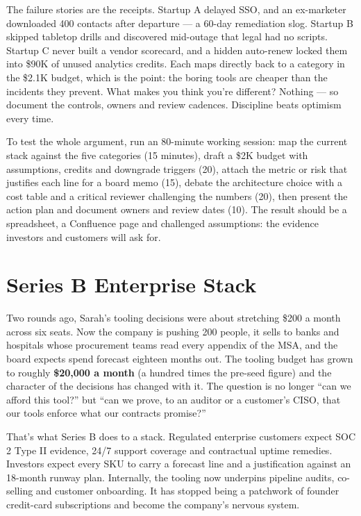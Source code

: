 The failure stories are the receipts. Startup A delayed SSO, and an ex-marketer downloaded 400 contacts after departure — a 60-day remediation slog. Startup B skipped tabletop drills and discovered mid-outage that legal had no scripts. Startup C never built a vendor scorecard, and a hidden auto-renew locked them into \$90K of unused analytics credits. Each maps directly back to a category in the \$2.1K budget, which is the point: the boring tools are cheaper than the incidents they prevent. What makes you think you're different? Nothing — so document the controls, owners and review cadences. Discipline beats optimism every time.


To test the whole argument, run an 80-minute working session: map the current stack against the five categories (15 minutes), draft a \$2K budget with assumptions, credits and downgrade triggers (20), attach the metric or risk that justifies each line for a board memo (15), debate the architecture choice with a cost table and a critical reviewer challenging the numbers (20), then present the action plan and document owners and review dates (10). The result should be a spreadsheet, a Confluence page and challenged assumptions: the evidence investors and customers will ask for.

\section{Series B Enterprise Stack}
Two rounds ago, Sarah's tooling decisions were about stretching \$200 a month across six seats. Now the company is pushing 200 people, it sells to banks and hospitals whose procurement teams read every appendix of the MSA, and the board expects spend forecast eighteen months out. The tooling budget has grown to roughly \textbf{\$20,000 a month} (a hundred times the pre-seed figure) and the character of the decisions has changed with it. The question is no longer ``can we afford this tool?'' but ``can we prove, to an auditor or a customer's CISO, that our tools enforce what our contracts promise?''


That's what Series B does to a stack. Regulated enterprise customers expect SOC 2 Type II evidence, 24/7 support coverage and contractual uptime remedies. Investors expect every SKU to carry a forecast line and a justification against an 18-month runway plan. Internally, the tooling now underpins pipeline audits, co-selling and customer onboarding. It has stopped being a patchwork of founder credit-card subscriptions and become the company's nervous system.



